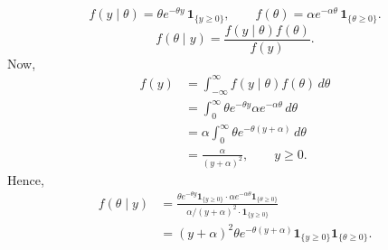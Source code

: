 \documentclass[12pt,a4paper,onecolumn]{exam}
\begin{document}
\begin{solution}
\[
f(y\mid \theta)=\theta e^{-\theta y}\,\mathbf{1}_{\{y\ge 0\}},\qquad
f(\theta)=\alpha e^{-\alpha\theta}\,\mathbf{1}_{\{\theta\ge 0\}}.
\]
\[
f(\theta\mid y)=\frac{f(y\mid \theta)f(\theta)}{f(y)}.
\]
Now,
\begin{align*}
f(y)
&=\int_{-\infty}^{\infty} f(y\mid \theta)f(\theta)\,d\theta\\
&=\int_0^\infty \theta e^{-\theta y}\alpha e^{-\alpha\theta}\,d\theta\\
&=\alpha\int_0^\infty \theta e^{-\theta(y+\alpha)}\,d\theta\\
&=\frac{\alpha}{(y+\alpha)^2},\qquad y\ge 0.
\end{align*}
Hence,
\begin{align*}
f(\theta\mid y)
&=\frac{\theta e^{-\theta y}\mathbf{1}_{\{y\ge0\}}\cdot \alpha e^{-\alpha\theta}\mathbf{1}_{\{\theta\ge0\}}}
{\alpha/(y+\alpha)^2\cdot \mathbf{1}_{\{y\ge0\}}}\\
&=(y+\alpha)^2\theta e^{-\theta(y+\alpha)}
\mathbf{1}_{\{y\ge0\}}\mathbf{1}_{\{\theta\ge0\}}.
\end{align*}


\end{solution}
\end{document}
